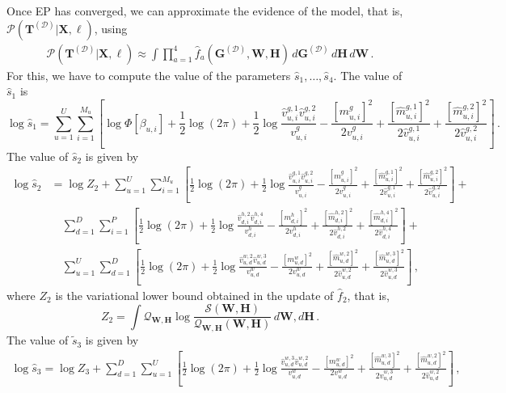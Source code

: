 \documentclass{article}
\begin{document}
Once EP has converged, we can approximate the evidence of the model, that is, $\mathcal{P}(\mathbf{T}^{(\mathcal{D})}|\mathbf{X},\ell)$, using
\begin{align}
\mathcal{P}(\mathbf{T}^{(\mathcal{D})}|\mathbf{X},\ell) \approx \int \prod_{a=1}^4
\hat{f}_a(\mathbf{G}^{(\mathcal{D})},\mathbf{W},\mathbf{H})\,d\mathbf{G}^{(\mathcal{D})}\,d\mathbf{H}\,d\mathbf{W}\,.
\end{align}
For this, we have to compute the value of the parameters $\hat{s}_1,\ldots,\hat{s}_4$. The value of $\hat{s}_1$ is
\begin{equation}
\log\hat{s}_1 = \sum_{u=1}^{U}\sum_{i=1}^{M_u}\left[\log \Phi[\beta_{u,i}] +
\frac{1}{2}\log(2\pi)+\frac{1}{2}\log \frac{\hat{v}_{u,i}^{g,1} \hat{v}_{u,i}^{g,2}}{v_{u,i}^g}-
\frac{[m_{u,i}^g]^2}{2v_{u,i}^g}+\frac{[\hat{m}_{u,i}^{g,1}]^2}{2\hat{v}_{u,i}^{g,1}}+
\frac{[\hat{m}_{u,i}^{g,2}]^2}{2\hat{v}_{u,i}^{g,2}}\right]\,.
\end{equation}
The value of $\hat{s}_2$ is given by
\begin{align}
\log\hat{s}_2 & = \log Z_2 + \sum_{u=1}^{U}\sum_{i=1}^{M_u}\left[\frac{1}{2}\log(2\pi)+
\frac{1}{2}\log \frac{\hat{v}_{u,i}^{g,1}\hat{v}_{u,i}^{g,2}}{v_{u,i}^g}-
\frac{[m_{u,i}^g]^2}{2v_{u,i}^g}+\frac{[\hat{m}_{u,i}^{g,1}]^2}{2\hat{v}_{u,i}^{g,1}}+
\frac{[\hat{m}_{u,i}^{g,2}]^2}{2\hat{v}_{u,i}^{g,2}}\right]+\nonumber\\
& \quad \sum_{d=1}^{D}\sum_{i=1}^{P}\left[\frac{1}{2}\log(2\pi)+
\frac{1}{2}\log \frac{\hat{v}_{d,i}^{h,2}\hat{v}_{d,i}^{h,4}}{v_{d,i}^h}-
\frac{[m_{d,i}^h]^2}{2v_{d,i}^h}+\frac{[\hat{m}_{d,i}^{h,2}]^2}{2\hat{v}_{d,i}^{h,2}}+
\frac{[\hat{m}_{d,i}^{h,4}]^2}{2\hat{v}_{d,i}^{h,4}}\right]+\nonumber\\
& \quad \sum_{u=1}^{U}\sum_{d=1}^{D}\left[\frac{1}{2}\log(2\pi)+
\frac{1}{2}\log \frac{\hat{v}_{u,d}^{w,2}\hat{v}_{u,d}^{w,3}}{v_{u,d}^w}-
\frac{[m_{u,d}^w]^2}{2v_{u,d}^w}+\frac{[\hat{m}_{u,d}^{w,2}]^2}{2\hat{v}_{u,d}^{w,2}}+
\frac{[\hat{m}_{u,d}^{w,3}]^2}{2\hat{v}_{u,d}^{w,3}}\right]\,,
\end{align}
where $Z_2$ is the variational lower bound obtained in the update of $\hat{f}_2$, that is,
\begin{equation}
Z_2 = \int \mathcal{Q}_{\mathbf{W},\mathbf{H}}\log\frac{\mathcal{S}(\mathbf{W},\mathbf{H})}
{\mathcal{Q}_{\mathbf{W},\mathbf{H}}(\mathbf{W},\mathbf{H})} \,d\mathbf{W},d\mathbf{H}\,.
\end{equation}
The value of $\tilde{s}_{3}$ is given by
\begin{align}
\log\hat{s}_3 = \log Z_3 + \sum_{d=1}^{D}\sum_{u=1}^{U}\left[
\frac{1}{2}\log(2\pi)+\frac{1}{2}\log \frac{\hat{v}_{u,d}^{w,3} \hat{v}_{u,d}^{w,2}}{v_{u,d}^w}-
\frac{[m_{u,d}^w]^2}{2v_{u,d}^w}+\frac{[\hat{m}_{u,d}^{w,3}]^2}{2\hat{v}_{u,d}^{w,3}}+
\frac{[\hat{m}_{u,d}^{w,2}]^2}{2\hat{v}_{u,d}^{w,2}}\right]\,,
\end{align}
\end{document}
